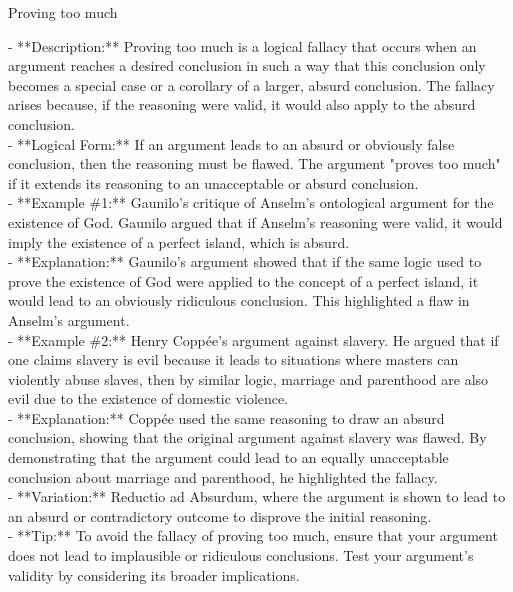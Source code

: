 \documentclass[a4paper,12pt,single,pdftex]{scrartcl}
\begin{document}
Proving too much
    
      - **Description:** Proving too much is a logical fallacy that occurs when an argument reaches a desired conclusion in such a way that this conclusion only becomes a special case or a corollary of a larger, absurd conclusion. The fallacy arises because, if the reasoning were valid, it would also apply to the absurd conclusion.
    \\

    
      - **Logical Form:** If an argument leads to an absurd or obviously false conclusion, then the reasoning must be flawed. The argument "proves too much" if it extends its reasoning to an unacceptable or absurd conclusion.
    \\

    
      - **Example \#1:** Gaunilo’s critique of Anselm’s ontological argument for the existence of God. Gaunilo argued that if Anselm's reasoning were valid, it would imply the existence of a perfect island, which is absurd.
    \\

    
      - **Explanation:** Gaunilo's argument showed that if the same logic used to prove the existence of God were applied to the concept of a perfect island, it would lead to an obviously ridiculous conclusion. This highlighted a flaw in Anselm's argument.
    \\

    
      - **Example \#2:** Henry Coppée’s argument against slavery. He argued that if one claims slavery is evil because it leads to situations where masters can violently abuse slaves, then by similar logic, marriage and parenthood are also evil due to the existence of domestic violence.
    \\

    
      - **Explanation:** Coppée used the same reasoning to draw an absurd conclusion, showing that the original argument against slavery was flawed. By demonstrating that the argument could lead to an equally unacceptable conclusion about marriage and parenthood, he highlighted the fallacy.
    \\

    
      - **Variation:** Reductio ad Absurdum, where the argument is shown to lead to an absurd or contradictory outcome to disprove the initial reasoning.
    \\

    
      - **Tip:** To avoid the fallacy of proving too much, ensure that your argument does not lead to implausible or ridiculous conclusions. Test your argument's validity by considering its broader implications.
    \\
\end{document}
